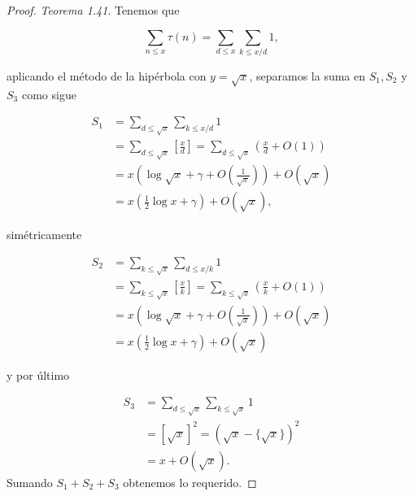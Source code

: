 \begin{proof} \textit{Teorema 1.41}. Tenemos que 

$$\sum_{n \leqslant x} \tau(n)=\sum_{d \leqslant x} \sum_{k \leqslant x / d} 1,$$

aplicando el método de la hipérbola con $y=\sqrt{x}$, separamos la suma en $S_1, S_2$ y $S_3$ como sigue 

$$\begin{aligned}
S_1 & =\sum_{d \leqslant \sqrt{x}} \sum_{k \leqslant x / d} 1 \\
& =\sum_{d \leqslant \sqrt{x}}\left[\frac{x}{d}\right]=\sum_{d \leqslant \sqrt{x}}\left(\frac{x}{d}+O(1)\right) \\
& =x\left(\log \sqrt{x}+\gamma+O\left(\frac{1}{\sqrt{x}}\right)\right)+O(\sqrt{x}) \\
& =x\left(\frac{1}{2} \log x+\gamma\right)+O(\sqrt{x}),
\end{aligned}$$

simétricamente 

$$\begin{aligned}
S_2 & =\sum_{k \leqslant \sqrt{x}} \sum_{d \leqslant x / k} 1 \\
& =\sum_{k \leqslant \sqrt{x}}\left[\frac{x}{k}\right]=\sum_{k \leqslant \sqrt{x}}\left(\frac{x}{k}+O(1)\right) \\
& =x\left(\log \sqrt{x}+\gamma+O\left(\frac{1}{\sqrt{x}}\right)\right)+O(\sqrt{x}) \\
& =x\left(\frac{1}{2} \log x+\gamma\right)+O(\sqrt{x})
\end{aligned}$$

y por último

$$\begin{aligned}
S_3 & =\sum_{d \leqslant \sqrt{x}} \sum_{k \leqslant \sqrt{x}} 1 \\
& =[\sqrt{x}]^2=(\sqrt{x}-\{\sqrt{x}\})^2 \\
& =x+O(\sqrt{x}).
\end{aligned}$$
Sumando $S_1+S_2+S_3$ obtenemos lo requerido.


\end{proof}